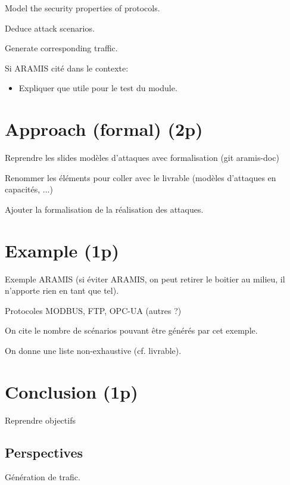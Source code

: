 \documentclass[11pt]{article}
\begin{document}
Model the security properties of protocols.

Deduce attack scenarios.

Generate corresponding traffic.

Si ARAMIS cité dans le contexte:
\begin{itemize}
    \item Expliquer que utile pour le test du module.
\end{itemize}

\section{Approach (formal) (2p)}

Reprendre les slides modèles d'attaques avec formalisation (git aramis-doc)

Renommer les éléments pour coller avec le livrable (modèles d'attaques en capacités, ...)

Ajouter la formalisation de la réalisation des attaques.

\section{Example (1p)}

Exemple ARAMIS (si éviter ARAMIS, on peut retirer le boitier au milieu,
il n'apporte rien en tant que tel).

Protocoles MODBUS, FTP, OPC-UA (autres ?)

On cite le nombre de scénarios pouvant être générés par cet exemple.

On donne une liste non-exhaustive (cf. livrable).

\section{Conclusion (1p)}

Reprendre objectifs

\subsection{Perspectives}

Génération de trafic.



\end{document}
